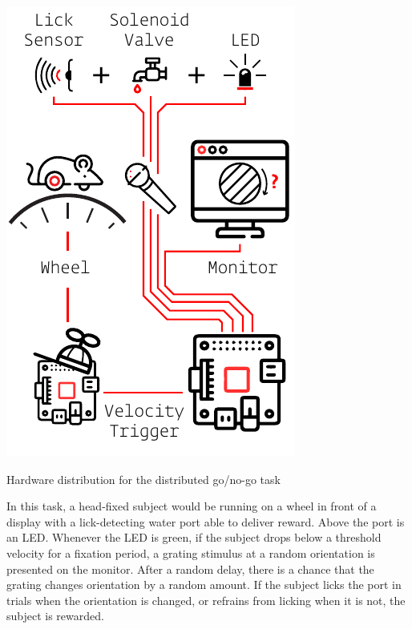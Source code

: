 \begin{marginfigure}[-0cm]
\includegraphics[]{figures/test_5_gonogo.pdf}
\caption{Hardware distribution for the distributed go/no-go task}
\label{fig:gonogo}
\end{marginfigure}

In this task, a head-fixed subject would be running on a wheel in front of a display with a lick-detecting water port able to deliver reward. Above the port is an LED. Whenever the LED is green, if the subject drops below a threshold velocity for a fixation period, a grating stimulus at a random orientation is presented on the monitor. After a random delay, there is a chance that the grating changes orientation by a random amount. If the subject licks the port in trials when the orientation is changed, or refrains from licking when it is not, the subject is rewarded. 

